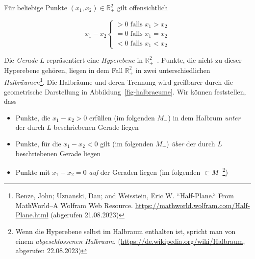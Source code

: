 Für beliebige Punkte $(x_1, x_2) \in \mathbb{R}_+^2$ gilt offensichtlich

\begin{equation}
x_1 - x_2 \begin{cases}
               > 0 \text{ falls } x_1 > x_2 \\
               = 0 \text{ falls } x_1 = x_2 \\
               < 0 \text{ falls } x_1 < x_2
\end{cases}
\end{equation}

Die \textit{Gerade} $L$ repräsentiert eine \textit{Hyperebene} in $\mathbb{R}_+^2$~\cite[81, Definition 2.3]{BHW+12}.
Punkte, die nicht zu dieser Hyperebene gehören, liegen in dem Fall $\mathbb{R}_+^2$ in zwei unterschiedlichen \textit{Halbräumen}\footnote{
    Renze, John; Uznanski, Dan; and Weisstein, Eric W. ``Half-Plane.`` From MathWorld--A Wolfram Web Resource. \url{https://mathworld.wolfram.com/Half-Plane.html} (abgerufen 21.08.2023)
}.
Die Halbräume und deren Trennung wird greifbarer durch die geometrische Darstellung in Abbildung~\ref{fig-halbraeume}.
Wir können feststellen, dass


\begin{itemize}
    \item Punkte, die $x_1 - x_2 > 0$ erfüllen (im folgenden $M_-$) in dem Halbrum \textit{unter} der durch $L$ beschriebenen Gerade liegen
    \item Punkte, für die  $x_1 - x_2 < 0$ gilt (im folgenden $M_+$) \textit{über} der durch $L$ beschriebenen Gerade liegen
    \item Punkte mit $x_1 - x_2 = 0$ \textit{auf} der Geraden liegen (im folgenden $\subset M_-$\footnote{
        Wenn die Hyperebene selbst im Halbraum enthalten ist, spricht man von einem \textit{abgeschlossenen Halbraum}. (\url{https://de.wikipedia.org/wiki/Halbraum}, abgerufen 22.08.2023)
    })
\end{itemize}


